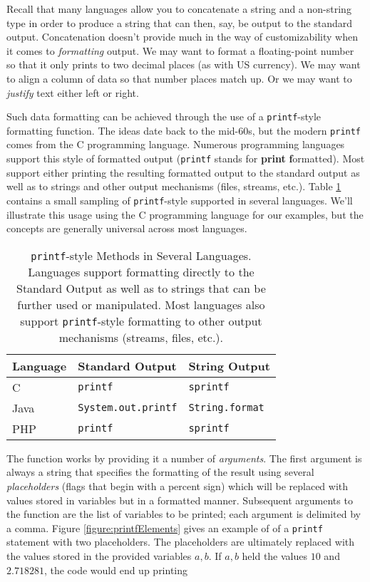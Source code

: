 Recall that many languages allow you to concatenate a string and a non-string type
in order to produce a string that can then, say, be output to the standard output.
Concatenation doesn't provide much in the way of customizability when it comes
to \emph{formatting} output.  We may want to format a floating-point number so
that it only prints to two decimal places (as with US currency).  We may want
to align a column of data so that number places match up.  Or we may want
to \emph{justify} text either left or right.

Such data formatting can be achieved through the use of a \texttt{printf}-style
formatting function.  The ideas date back to the mid-60s, but the modern \texttt{printf}
comes from the C programming language.  Numerous programming languages support
this style of formatted output (\texttt{printf} stands for \textbf{print} \textbf{f}ormatted).
Most support either printing the resulting formatted output to the standard output as well as
to strings and other output mechanisms (files, streams, etc.).  Table \ref{table:printfSupport}
contains a small sampling of \texttt{printf}-style supported in several languages.
We'll illustrate this usage using the C programming language for our examples, but the 
concepts are generally universal across most languages.

\begin{table}
\centering
\begin{tabular}{l|l|l}
Language & Standard Output & String Output \\
\hline\hline
C & \texttt{printf} &  \texttt{sprintf} \\
Java & \texttt{System.out.printf} & \texttt{String.format} \\
PHP & \texttt{printf} & \texttt{sprintf} \\
\end{tabular}
\caption[\texttt{printf}-style Methods in Several Languages]{\texttt{printf}-style Methods in Several Languages.  
Languages support formatting directly to the Standard Output as well as to strings that can be further used or manipulated.
Most languages also support \texttt{printf}-style formatting to other output mechanisms (streams, files, etc.).}
\label{table:printfSupport}
\end{table}

The function works by providing it a number of \emph{arguments}.  The first argument is
always a string that specifies the formatting of the result using several 
\emph{placeholders} (flags that begin with a percent sign) which will be replaced 
with values stored in variables but in
a formatted manner.  Subsequent arguments to the function are the list of variables
to be printed; each argument is delimited by a comma.  Figure \ref{figure:printfElements} 
gives an example of of a \texttt{printf}
statement with two placeholders.  The placeholders are ultimately replaced with 
the values stored in the provided variables $a, b$.  If $a, b$ held the values $10$ and
$2.718281$, the code would end up printing

